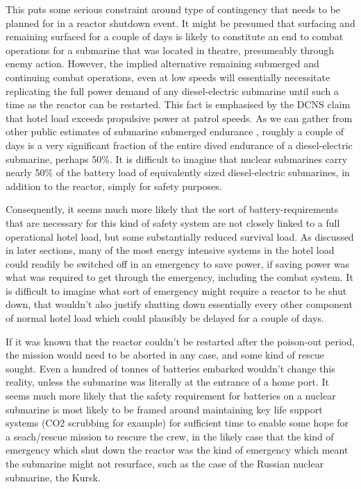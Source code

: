 \documentclass{article}\usepackage[]{graphicx}\usepackage[]{color}
\begin{document}
This puts some serious constraint around type of contingency that needs to be planned for in a reactor shutdown event.  It might be presumed that surfacing and remaining surfaced for a couple of days is likely to constitute an end to combat operations for a submarine that was located in theatre, presumeably through enemy action.  However, the implied alternative remaining submerged and continuing combat operations, even at low speeds will essentially necessitate replicating the full power demand of any diesel-electric submarine until such a time as the reactor can be restarted. This fact is emphasised by the DCNS claim that hotel load exceeds propulsive power at patrol speeds.  As we can gather from other public estimates of submarine submerged endurance \parencite{buckingham2008submarine}, roughly a couple of days is a very significant fraction of the entire dived endurance of a diesel-electric submarine, perhaps 50\%.  It is difficult to imagine that nuclear submarines carry nearly 50\% of the battery load of equivalently sized diesel-electric submarines, in addition to the reactor, simply for safety purposes.

Consequently, it seems much more likely that the sort of battery-requirements that are necessary for this kind of safety system are not closely linked to a full operational hotel load, but some substantially reduced survival load.  As discussed in later sections, many of the most energy intensive systems in the hotel load could readily be switched off in an emergency to save power, if saving power was what was required to get through the emergency, including the combat system.  It is difficult to imagine what sort of emergency might require a reactor to be shut down, that wouldn't also justify shutting down essentially every other component of normal hotel load which could plausibly be delayed for a couple of days.

If it was known that the reactor couldn't be restarted after the poison-out period, the mission would need to be aborted in any case, and some kind of rescue sought. Even a hundred of tonnes of batteries embarked wouldn't change this reality, unless the submarine was literally at the entrance of a home port.  It seems much more likely that the safety requirement for batteries on a nuclear submarine is most likely to be framed around maintaining key life support systems (CO2 scrubbing for example) for sufficient time to enable some hope for a seach/rescue mission to rescure the crew, in the likely case that the kind of emergency which shut down the reactor was the kind of emergency which meant the submarine might not resurface, such as the case of the Russian nuclear submarine, the Kursk.
\end{document}
